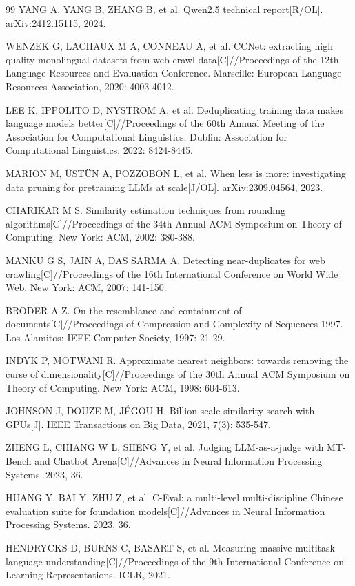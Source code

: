 \documentclass[fontset=fandol,type=master,campus=shenzhen,etitleauto=true]{hithesisbook}
\begin{document}
\begin{thebibliography}{99}
 YANG A, YANG B, ZHANG B, et al. Qwen2.5 technical report[R/OL]. arXiv:2412.15115, 2024.

 WENZEK G, LACHAUX M A, CONNEAU A, et al. CCNet: extracting high quality monolingual datasets from web crawl data[C]//Proceedings of the 12th Language Resources and Evaluation Conference. Marseille: European Language Resources Association, 2020: 4003-4012.

 LEE K, IPPOLITO D, NYSTROM A, et al. Deduplicating training data makes language models better[C]//Proceedings of the 60th Annual Meeting of the Association for Computational Linguistics. Dublin: Association for Computational Linguistics, 2022: 8424-8445.

 MARION M, ÜSTÜN A, POZZOBON L, et al. When less is more: investigating data pruning for pretraining LLMs at scale[J/OL]. arXiv:2309.04564, 2023.

 CHARIKAR M S. Similarity estimation techniques from rounding algorithms[C]//Proceedings of the 34th Annual ACM Symposium on Theory of Computing. New York: ACM, 2002: 380-388.

 MANKU G S, JAIN A, DAS SARMA A. Detecting near-duplicates for web crawling[C]//Proceedings of the 16th International Conference on World Wide Web. New York: ACM, 2007: 141-150.

 BRODER A Z. On the resemblance and containment of documents[C]//Proceedings of Compression and Complexity of Sequences 1997. Los Alamitos: IEEE Computer Society, 1997: 21-29.

 INDYK P, MOTWANI R. Approximate nearest neighbors: towards removing the curse of dimensionality[C]//Proceedings of the 30th Annual ACM Symposium on Theory of Computing. New York: ACM, 1998: 604-613.

 JOHNSON J, DOUZE M, JÉGOU H. Billion-scale similarity search with GPUs[J]. IEEE Transactions on Big Data, 2021, 7(3): 535-547.

 ZHENG L, CHIANG W L, SHENG Y, et al. Judging LLM-as-a-judge with MT-Bench and Chatbot Arena[C]//Advances in Neural Information Processing Systems. 2023, 36.

 HUANG Y, BAI Y, ZHU Z, et al. C-Eval: a multi-level multi-discipline Chinese evaluation suite for foundation models[C]//Advances in Neural Information Processing Systems. 2023, 36.

 HENDRYCKS D, BURNS C, BASART S, et al. Measuring massive multitask language understanding[C]//Proceedings of the 9th International Conference on Learning Representations. ICLR, 2021.


\end{thebibliography}
\end{document}
